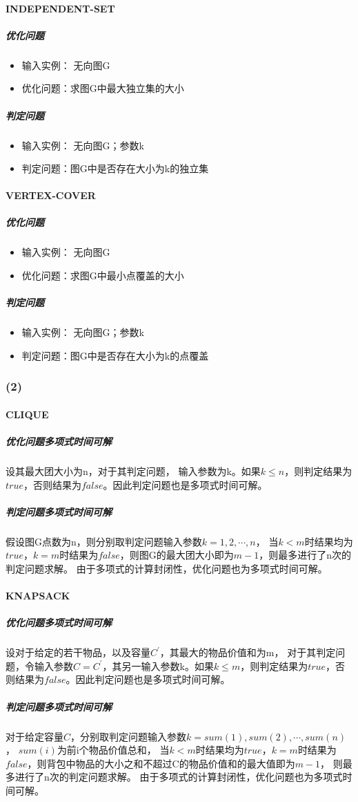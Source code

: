 \documentclass[11pt,a4paper,oneside,oldfontcommands]{ctexart}
\begin{document}
\paragraph*{INDEPENDENT-SET}
\subparagraph*{优化问题}
\begin{itemize}
	\item {输入实例： 无向图G}
	\item {优化问题：求图G中最大独立集的大小}
\end{itemize}
\subparagraph*{判定问题}
\begin{itemize}
	\item {输入实例： 无向图G；参数k}
	\item {判定问题：图G中是否存在大小为k的独立集}
\end{itemize}
\paragraph*{VERTEX-COVER}
\subparagraph*{优化问题}
\begin{itemize}
	\item {输入实例： 无向图G}
	\item {优化问题：求图G中最小点覆盖的大小}
\end{itemize}
\subparagraph*{判定问题}
\begin{itemize}
	\item {输入实例： 无向图G；参数k}
	\item {判定问题：图G中是否存在大小为k的点覆盖}
\end{itemize}
\subsubsection*{(2)}
\paragraph*{CLIQUE}
\subparagraph*{优化问题多项式时间可解} 设其最大团大小为n，对于其判定问题，
输入参数为k。如果$k\leq n$，则判定结果为$true$，否则结果为$false$。因此判定问题也是多项式时间可解。
\subparagraph*{判定问题多项式时间可解} 假设图G点数为n，则分别取判定问题输入参数$k=1,2,\cdots,n$，
当$k<m$时结果均为$true$，$k=m$时结果为$false$，则图G的最大团大小即为$m-1$，则最多进行了n次的判定问题求解。
由于多项式的计算封闭性，优化问题也为多项式时间可解。
\paragraph*{KNAPSACK}
\subparagraph*{优化问题多项式时间可解} 设对于给定的若干物品，以及容量$C^{'}$，其最大的物品价值和为m，
对于其判定问题，令输入参数$C=C^{'}$，其另一输入参数k。如果$k\leq m$，则判定结果为$true$，否则结果为$false$。因此判定问题也是多项式时间可解。
\subparagraph*{判定问题多项式时间可解} 对于给定容量$C$，分别取判定问题输入参数$k=sum(1),sum(2),\cdots,sum(n)$，
$sum(i)$为前i个物品价值总和，
当$k<m$时结果均为$true$，$k=m$时结果为$false$，则背包中物品的大小之和不超过C的物品价值和的最大值即为$m-1$，
则最多进行了n次的判定问题求解。
由于多项式的计算封闭性，优化问题也为多项式时间可解。
\end{document}
